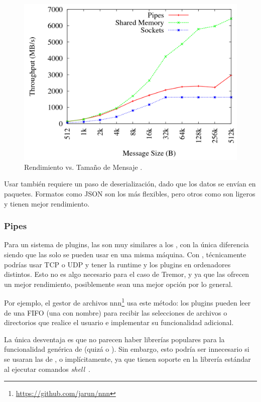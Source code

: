 \begin{figure}
    \centering
    \includegraphics[width=12cm]{./Imagenes/venkataraman2015evaluation2.png}
    \caption{Rendimiento vs. Tamaño de Mensaje
    \cite{venkataraman2015evaluation}.}%
    \label{fig:ipc_comparison2}
\end{figure}

Usar \sockets también requiere un paso de deserialización, dado que los datos se
envían en paquetes. Formatos como JSON son los más flexibles, pero otros como
\textcite{protobuf} son ligeros y tienen mejor rendimiento.

\subsubsection{Pipes}

Para un sistema de plugins, las \pipes son muy similares a los \sockets, con la
única diferencia siendo que las \pipes solo se pueden usar en una misma máquina.
Con \sockets, técnicamente podrías usar TCP o UDP y tener la runtime y los
plugins en ordenadores distintos. Esto no es algo necesario para el caso de
Tremor, y ya que las \pipes ofrecen un mejor rendimiento, posiblemente sean una
mejor opción por lo general.

Por ejemplo, el gestor de archivos
nnn\footnote{\url{https://github.com/jarun/nnn}} usa este método: los plugins
pueden leer de una FIFO (una \pipe con nombre) para recibir las selecciones de
archivos o directorios que realice el usuario e implementar su funcionalidad
adicional.

La única desventaja es que no parecen haber librerías populares para la
funcionalidad genérica de \pipes (quizá  o
). Sin embargo, esto podría ser innecesario si se usaran las
\pipes de \stdin, \stdout o \stderr implícitamente, ya que tienen soporte en la
librería estándar al ejecutar comandos \emph{shell}~\cite{rustpipes}.

